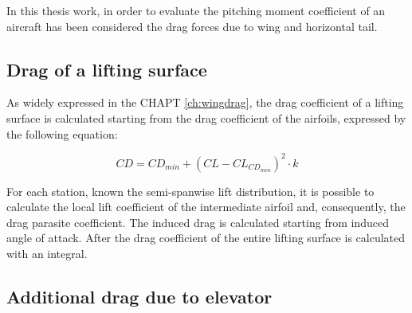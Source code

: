 In this thesis work, in order to evaluate the pitching moment coefficient of an aircraft has been considered the drag forces due to wing and horizontal tail.

\subsection{Drag of a lifting surface}

As widely expressed in the CHAPT  \ref{ch:wingdrag}, the drag coefficient of a lifting surface is calculated starting from the drag coefficient of the airfoils, expressed by the following equation:

\begin{equation}
CD = CD_{min} + (CL - CL_{CD_{min}})^2 \cdot k
\end{equation}

For each station, known the semi-spanwise lift distribution, it is possible to calculate the local lift coefficient of the intermediate airfoil and, consequently, the drag parasite coefficient. The induced drag is calculated starting from induced angle of attack. After the drag coefficient of the entire lifting surface is calculated with an integral.

\subsection{Additional drag due to elevator}

